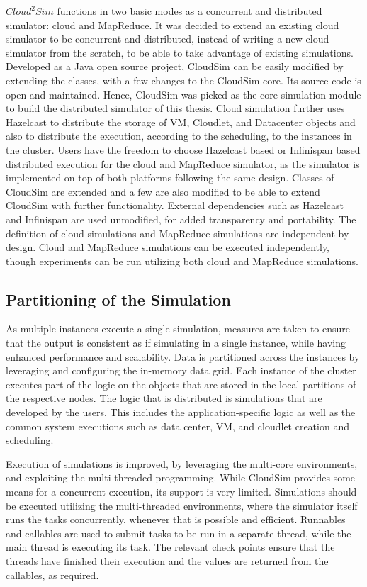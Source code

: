 $Cloud^{2}Sim$ functions in two basic modes as a concurrent and distributed simulator: cloud and MapReduce. It was decided to extend an existing cloud simulator to be concurrent and distributed, instead of writing a new cloud simulator from the scratch, to be able to take advantage of existing simulations. Developed as a Java open source project, CloudSim can be easily modified by extending the classes, with a few changes to the CloudSim core. Its source code is open and maintained. Hence, CloudSim was picked as the core simulation module to build the distributed simulator of this thesis. Cloud simulation further uses Hazelcast to distribute the storage of VM, Cloudlet, and Datacenter objects and also to distribute the execution, according to the scheduling, to the instances in the cluster. Users have the freedom to choose Hazelcast based or Infinispan based distributed execution for the cloud and MapReduce simulator, as the simulator is implemented on top of both platforms following the same design. Classes of CloudSim are extended and a few are also modified to be able to extend CloudSim with further functionality.  External dependencies such as Hazelcast and Infinispan are used unmodified, for added transparency and portability. The definition of cloud simulations and MapReduce simulations are independent by design. Cloud and MapReduce simulations can be executed independently, though experiments can be run utilizing both cloud and MapReduce simulations. 

\subsection{Partitioning of the Simulation}
\label{ssec:3partition}
As multiple instances execute a single simulation, measures are taken to ensure that the output is consistent as if simulating in a single instance, while having enhanced performance and scalability. Data is partitioned across the instances by leveraging and configuring the in-memory data grid. Each instance of the cluster executes part of the logic on the objects that are stored in the local partitions of the respective nodes. The logic that is distributed is simulations that are developed by the users. This includes the application-specific logic as well as the common system executions such as data center, VM, and cloudlet creation and scheduling.

Execution of simulations is improved, by leveraging the multi-core environments, and exploiting the multi-threaded programming. While CloudSim provides some means for a concurrent execution, its support is very limited. Simulations should be executed utilizing the multi-threaded environments, where the simulator itself runs the tasks concurrently, whenever that is possible and efficient. Runnables and callables are used to submit tasks to be run in a separate thread, while the main thread is executing its task. The relevant check points ensure that the threads have finished their execution and the values are returned from the callables, as required. 


